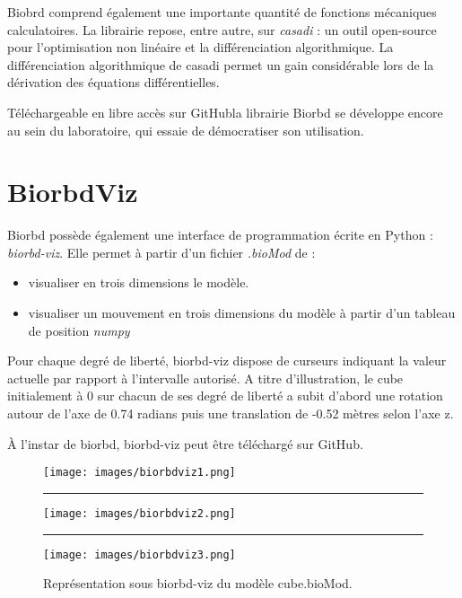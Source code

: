 Biobrd comprend également une importante quantité de fonctions mécaniques calculatoires. La librairie repose, entre autre,
sur \emph{\gls{casadi}} \footnotemark[3] : un outil open-source pour l'optimisation non linéaire et la différenciation algorithmique. La différenciation algorithmique de casadi permet un gain considérable lors de la dérivation des équations différentielles.


Téléchargeable en libre accès sur GitHub\footnotemark[1] la librairie Biorbd se développe encore au sein du laboratoire, qui essaie de démocratiser son utilisation.



        
        \section{BiorbdViz}

Biorbd possède également une interface de programmation écrite en Python : \emph{biorbd-viz}. Elle permet à partir d'un fichier \emph{.bioMod} de :

\begin{itemize}
\setlength\itemsep{-0.5em}
\item visualiser en trois dimensions le modèle.
\item visualiser un mouvement en trois dimensions du modèle à partir d'un tableau de position \emph{\gls{numpy}}
\end{itemize}

Pour chaque degré de liberté, biorbd-viz dispose de curseurs indiquant la valeur actuelle par rapport à l'intervalle autorisé.
A titre d'illustration, le cube initialement à 0 sur chacun de ses degré de liberté a subit d'abord une rotation autour de l'axe de 0.74 radians puis une translation de -0.52 mètres selon l'axe z.

\`A l'instar de biorbd, biorbd-viz peut être téléchargé sur GitHub\footnotemark[2].



\begin{figure}[H]
\begin{center}
\texttt{[image: images/biorbdviz1.png]}
\rule{\linewidth}{0mm}
\texttt{[image: images/biorbdviz2.png]}
\rule{\linewidth}{0mm}
\texttt{[image: images/biorbdviz3.png]}
\caption{Représentation sous biorbd-viz du modèle cube.bioMod.}
\end{center}
\end{figure}

